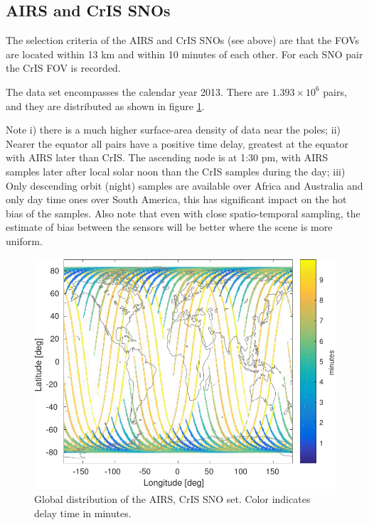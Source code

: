 \documentclass[11pt]{article}
\begin{document}
\subsection{AIRS and CrIS SNOs}
\label{sec:orgheadline9}

The selection criteria of the AIRS and CrIS SNOs (see above) are that the FOVs are located
within 13 km and within 10 minutes of each other. For each SNO pair the CrIS FOV is recorded. 

The data set encompasses the calendar year 2013. There are $1.393\times 10^{6}$ pairs, and they are distributed as shown in figure \ref{fig:Y1}.

Note i) there is a much higher surface-area density of data near the poles; 
ii) Nearer the equator all pairs have a positive time delay, greatest at the equator with AIRS later than CrIS. The ascending node is at 1:30 pm, with
AIRS samples later after local solar noon than the CrIS samples during the day; 
iii) Only descending orbit (night) samples are available over Africa and Australia and only day time ones over South America, this has significant impact on the hot bias of the samples. Also note that even with close spatio-temporal sampling, the estimate of bias between the sensors will be better where the scene is more uniform.

\begin{figure}[htb]
\centering
\includegraphics[width=.6\linewidth]{./figs/AC_jplSNO_delay_map.pdf}
\caption{\label{fig:orgparagraph10}
  Global distribution of the AIRS, CrIS SNO set. Color indicates delay time in minutes.}
\label{fig:Y1}
\end{figure}
\end{document}
